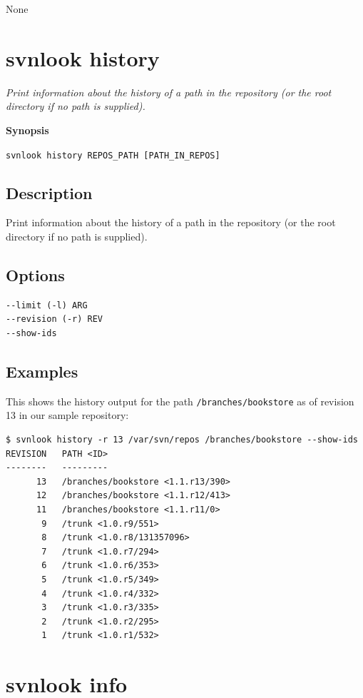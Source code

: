 None

\section{svnlook history}\label{svn.ref.svnlook.c.history}

\emph{Print information about the history of a path in the repository
(or the root directory if no path is supplied).}

\textbf{Synopsis}

\texttt{svnlook\ history\ REPOS\_PATH\ {[}PATH\_IN\_REPOS{]}}

\subsection{Description}

Print information about the history of a path in the repository (or the
root directory if no path is supplied).

\subsection{Options}

\begin{verbatim}
--limit (-l) ARG
--revision (-r) REV
--show-ids
\end{verbatim}

\subsection{Examples}

This shows the history output for the path \texttt{/branches/bookstore}
as of revision 13 in our sample repository:

\begin{verbatim}
$ svnlook history -r 13 /var/svn/repos /branches/bookstore --show-ids
REVISION   PATH <ID>
--------   ---------
      13   /branches/bookstore <1.1.r13/390>
      12   /branches/bookstore <1.1.r12/413>
      11   /branches/bookstore <1.1.r11/0>
       9   /trunk <1.0.r9/551>
       8   /trunk <1.0.r8/131357096>
       7   /trunk <1.0.r7/294>
       6   /trunk <1.0.r6/353>
       5   /trunk <1.0.r5/349>
       4   /trunk <1.0.r4/332>
       3   /trunk <1.0.r3/335>
       2   /trunk <1.0.r2/295>
       1   /trunk <1.0.r1/532>
\end{verbatim}

\section{svnlook info}\label{svn.ref.svnlook.c.info}

